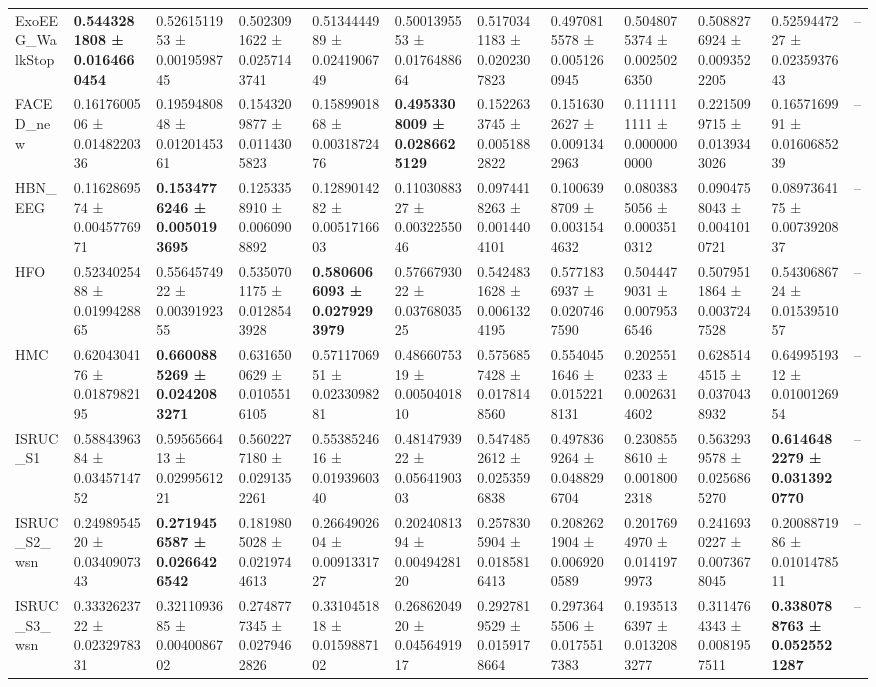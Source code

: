 \begin{table}[htbp]
\begin{tabular}{llllllllllll}
ExoEEG_WalkStop & \bfseries 0.5443281808 ± 0.0164660454 & 0.5261511953 ± 0.0019598745 & 0.5023091622 ± 0.0257143741 & 0.5134444989 ± 0.0241906749 & 0.5001395553 ± 0.0176488664 & 0.5170341183 ± 0.0202307823 & 0.4970815578 ± 0.0051260945 & 0.5048075374 ± 0.0025026350 & 0.5088276924 ± 0.0093522205 & 0.5259447227 ± 0.0235937643 & -- \\
FACED_new & 0.1617600506 ± 0.0148220336 & 0.1959480848 ± 0.0120145361 & 0.1543209877 ± 0.0114305823 & 0.1589901868 ± 0.0031872476 & \bfseries 0.4953308009 ± 0.0286625129 & 0.1522633745 ± 0.0051882822 & 0.1516302627 ± 0.0091342963 & 0.1111111111 ± 0.0000000000 & 0.2215099715 ± 0.0139343026 & 0.1657169991 ± 0.0160685239 & -- \\
HBN_EEG & 0.1162869574 ± 0.0045776971 & \bfseries 0.1534776246 ± 0.0050193695 & 0.1253358910 ± 0.0060908892 & 0.1289014282 ± 0.0051716603 & 0.1103088327 ± 0.0032255046 & 0.0974418263 ± 0.0014404101 & 0.1006398709 ± 0.0031544632 & 0.0803835056 ± 0.0003510312 & 0.0904758043 ± 0.0041010721 & 0.0897364175 ± 0.0073920837 & -- \\
HFO & 0.5234025488 ± 0.0199428865 & 0.5564574922 ± 0.0039192355 & 0.5350701175 ± 0.0128543928 & \bfseries 0.5806066093 ± 0.0279293979 & 0.5766793022 ± 0.0376803525 & 0.5424831628 ± 0.0061324195 & 0.5771836937 ± 0.0207467590 & 0.5044479031 ± 0.0079536546 & 0.5079511864 ± 0.0037247528 & 0.5430686724 ± 0.0153951057 & -- \\
HMC & 0.6204304176 ± 0.0187982195 & \bfseries 0.6600885269 ± 0.0242083271 & 0.6316500629 ± 0.0105516105 & 0.5711706951 ± 0.0233098281 & 0.4866075319 ± 0.0050401810 & 0.5756857428 ± 0.0178148560 & 0.5540451646 ± 0.0152218131 & 0.2025510233 ± 0.0026314602 & 0.6285144515 ± 0.0370438932 & 0.6499519312 ± 0.0100126954 & -- \\
ISRUC_S1 & 0.5884396384 ± 0.0345714752 & 0.5956566413 ± 0.0299561221 & 0.5602277180 ± 0.0291352261 & 0.5538524616 ± 0.0193960340 & 0.4814793922 ± 0.0564190303 & 0.5474852612 ± 0.0253596838 & 0.4978369264 ± 0.0488296704 & 0.2308558610 ± 0.0018002318 & 0.5632939578 ± 0.0256865270 & \bfseries 0.6146482279 ± 0.0313920770 & -- \\
ISRUC_S2_wsn & 0.2498954520 ± 0.0340907343 & \bfseries 0.2719456587 ± 0.0266426542 & 0.1819805028 ± 0.0219744613 & 0.2664902604 ± 0.0091331727 & 0.2024081394 ± 0.0049428120 & 0.2578305904 ± 0.0185816413 & 0.2082621904 ± 0.0069200589 & 0.2017694970 ± 0.0141979973 & 0.2416930227 ± 0.0073678045 & 0.2008871986 ± 0.0101478511 & -- \\
ISRUC_S3_wsn & 0.3332623722 ± 0.0232978331 & 0.3211093685 ± 0.0040086702 & 0.2748777345 ± 0.0279462826 & 0.3310451818 ± 0.0159887102 & 0.2686204920 ± 0.0456491917 & 0.2927819529 ± 0.0159178664 & 0.2973645506 ± 0.0175517383 & 0.1935136397 ± 0.0132083277 & 0.3114764343 ± 0.0081957511 & \bfseries 0.3380788763 ± 0.0525521287 & -- \\

\end{tabular}
\end{table}
